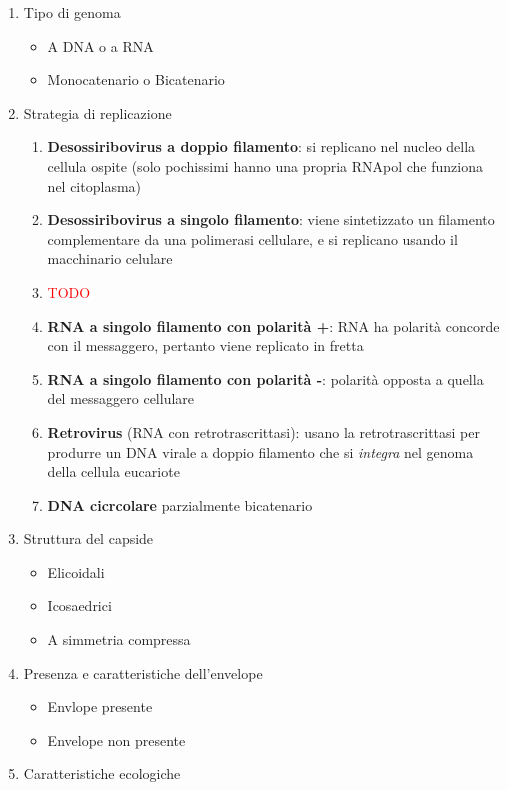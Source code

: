\documentclass[italian,]{article}
\providecommand{\tightlist}{%
  \setlength{\itemsep}{0pt}\setlength{\parskip}{0pt}}
\newcommand{\TODO}[1]{\textcolor{red}{\textsf{\footnotesize{TODO #1}}}} %
\begin{document}
\begin{enumerate}
\def\labelenumi{\arabic{enumi}.}
\tightlist
\item
  Tipo di genoma

  \begin{itemize}
  \tightlist
  \item
    A DNA o a RNA
  \item
    Monocatenario o Bicatenario
  \end{itemize}
\item
  Strategia di replicazione

  \begin{enumerate}
  \def\labelenumii{\arabic{enumii}.}
  \item
    \textbf{Desossiribovirus a doppio filamento}: si replicano nel
    nucleo della cellula ospite (solo pochissimi hanno una propria
    RNApol che funziona nel citoplasma)
  \item
    \textbf{Desossiribovirus a singolo filamento}: viene sintetizzato un
    filamento complementare da una polimerasi cellulare, e si replicano
    usando il macchinario celulare
  \item
    \TODO{}
  \item
    \textbf{RNA a singolo filamento con polarità +}: RNA ha polarità
    concorde con il messaggero, pertanto viene replicato in fretta
  \item
    \textbf{RNA a singolo filamento con polarità -}: polarità opposta a
    quella del messaggero cellulare
  \item
    \textbf{Retrovirus} (RNA con retrotrascrittasi): usano la
    retrotrascrittasi per produrre un DNA virale a doppio filamento che
    si \emph{integra} nel genoma della cellula eucariote
  \item
    \textbf{DNA cicrcolare} parzialmente bicatenario
  \end{enumerate}
\item
  Struttura del capside

  \begin{itemize}
  \tightlist
  \item
    Elicoidali
  \item
    Icosaedrici
  \item
    A simmetria compressa
  \end{itemize}
\item
  Presenza e caratteristiche dell'envelope

  \begin{itemize}
  \tightlist
  \item
    Envlope presente
  \item
    Envelope non presente
  \end{itemize}
\item
  Caratteristiche ecologiche
\end{enumerate}
\end{document}
